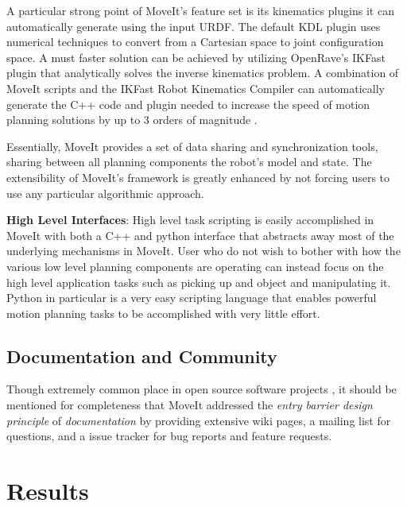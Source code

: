 \documentclass[10pt,journal,compsoc]{joser1}
\begin{document}
{A particular strong point of MoveIt's feature set is its kinematics plugins it can automatically generate using the input URDF. The default KDL plugin uses numerical techniques to convert from a Cartesian space to joint configuration space. A must faster solution can be achieved by utilizing OpenRave's IKFast \cite{ikfast} plugin that analytically solves the inverse kinematics problem. A combination of MoveIt scripts and the IKFast Robot Kinematics Compiler can automatically generate the C++ code and plugin needed to increase the speed of motion planning solutions by up to 3 orders of magnitude \cite{ikfast}.

Essentially, MoveIt provides a set of data sharing and synchronization tools, sharing between all planning components the robot's model and state. The extensibility of MoveIt's framework is greatly enhanced by not forcing users to use any particular algorithmic approach. 

{\bf High Level Interfaces}: High level task scripting is easily accomplished in MoveIt with both a C++ and python interface that abstracts away most of the underlying mechanisms in MoveIt. User who do not wish to bother with how the various low level planning components are operating can instead focus on the high level application tasks such as picking up and object and manipulating it. Python in particular is a very easy scripting language that enables powerful motion planning tasks to be accomplished with very little effort.

\subsection{Documentation and Community}

Though extremely common place in open source software projects \cite{bruyninckx2001open}, it should be mentioned for completeness that MoveIt addressed the \textit{entry barrier design principle} of \textit{documentation} by providing extensive wiki pages, a mailing list for questions, and a issue tracker for bug reports and feature requests.

\section{Results}
\label{sec::results}

}
\end{document}
